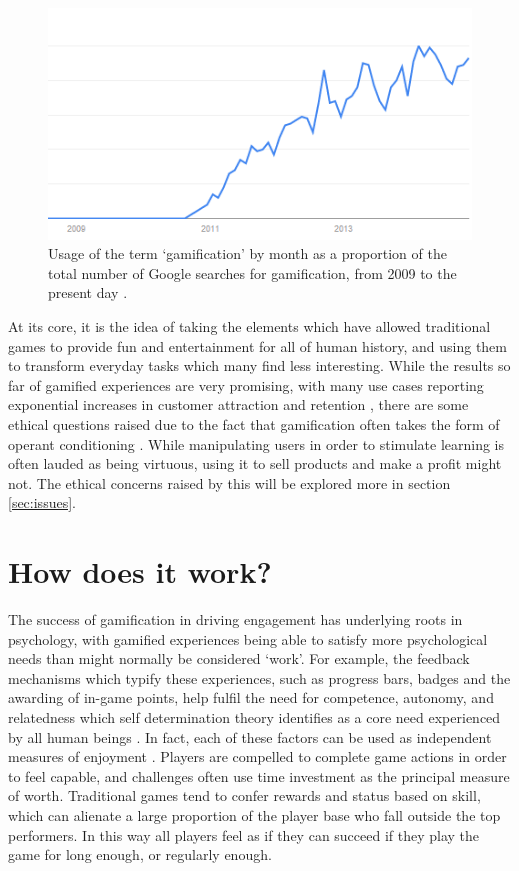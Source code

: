\documentclass[12pt,a4paper,twoside]{report}
\begin{document}
\begin{figure}
\begin{center}
	\includegraphics{../img/usage-graph.png}
	\caption{Usage of the term `gamification' by month as a proportion of the total number of Google searches for gamification, from 2009 to the present day \cite{usage}.}
	\label{usagegraph}
\end{center}
\end{figure}

At its core, it is the idea of taking the elements which have allowed traditional games to provide fun and entertainment for all of human history, and using them to transform everyday tasks which many find less interesting. While the results so far of gamified experiences are very promising, with many use cases reporting exponential increases in customer attraction and retention \cite{zichermann2010game}, there are some ethical questions raised due to the fact that gamification often takes the form of operant conditioning \cite{kapp2012gamification}. While manipulating users in order to stimulate learning is often lauded as being virtuous, using it to sell products and make a profit might not. The ethical concerns raised by this will be explored more in section \ref{sec:issues}.

\section{How does it work?}
The success of gamification in driving engagement has underlying roots in psychology, with gamified experiences being able to satisfy more psychological needs than might normally be considered `work'. For example, the feedback mechanisms which typify these experiences, such as progress bars, badges and the awarding of in-game points, help fulfil the need for competence, autonomy, and relatedness which self determination theory identifies as a core need experienced by all human beings \cite{przybylski2010motivational}. In fact, each of these factors can be used as independent measures of enjoyment \cite{kapp2012gamification}. Players are compelled to complete game actions in order to feel capable, and challenges often use time investment as the principal measure of worth. Traditional games tend to confer rewards and status based on skill, which can alienate a large proportion of the player base who fall outside the top performers. In this way all players feel as if they can succeed if they play the game for long enough, or regularly enough.
\end{document}

